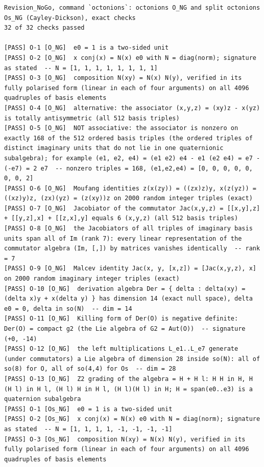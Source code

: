 \documentclass[
  10pt,
]{article}
\begin{document}
\begin{verbatim}
Revision_NoGo, command `octonions`: octonions O_NG and split octonions Os_NG (Cayley-Dickson), exact checks
32 of 32 checks passed

[PASS] O-1 [O_NG]  e0 = 1 is a two-sided unit
[PASS] O-2 [O_NG]  x conj(x) = N(x) e0 with N = diag(norm); signature as stated  -- N = [1, 1, 1, 1, 1, 1, 1, 1]
[PASS] O-3 [O_NG]  composition N(xy) = N(x) N(y), verified in its fully polarised form (linear in each of four arguments) on all 4096 quadruples of basis elements
[PASS] O-4 [O_NG]  alternative: the associator (x,y,z) = (xy)z - x(yz) is totally antisymmetric (all 512 basis triples)
[PASS] O-5 [O_NG]  NOT associative: the associator is nonzero on exactly 168 of the 512 ordered basis triples (the ordered triples of distinct imaginary units that do not lie in one quaternionic subalgebra); for example (e1, e2, e4) = (e1 e2) e4 - e1 (e2 e4) = e7 - (-e7) = 2 e7  -- nonzero triples = 168, (e1,e2,e4) = [0, 0, 0, 0, 0, 0, 0, 2]
[PASS] O-6 [O_NG]  Moufang identities z(x(zy)) = ((zx)z)y, x(z(yz)) = ((xz)y)z, (zx)(yz) = (z(xy))z on 2000 random integer triples (exact)
[PASS] O-7 [O_NG]  Jacobiator of the commutator Jac(x,y,z) = [[x,y],z] + [[y,z],x] + [[z,x],y] equals 6 (x,y,z) (all 512 basis triples)
[PASS] O-8 [O_NG]  the Jacobiators of all triples of imaginary basis units span all of Im (rank 7): every linear representation of the commutator algebra (Im, [,]) by matrices vanishes identically  -- rank = 7
[PASS] O-9 [O_NG]  Malcev identity Jac(x, y, [x,z]) = [Jac(x,y,z), x] on 2000 random imaginary integer triples (exact)
[PASS] O-10 [O_NG]  derivation algebra Der = { delta : delta(xy) = (delta x)y + x(delta y) } has dimension 14 (exact null space), delta e0 = 0, delta in so(N)  -- dim = 14
[PASS] O-11 [O_NG]  Killing form of Der(O) is negative definite: Der(O) = compact g2 (the Lie algebra of G2 = Aut(O))  -- signature (+0, -14)
[PASS] O-12 [O_NG]  the left multiplications L_e1..L_e7 generate (under commutators) a Lie algebra of dimension 28 inside so(N): all of so(8) for O, all of so(4,4) for Os  -- dim = 28
[PASS] O-13 [O_NG]  Z2 grading of the algebra = H + H l: H H in H, H (H l) in H l, (H l) H in H l, (H l)(H l) in H; H = span(e0..e3) is a quaternion subalgebra
[PASS] O-1 [Os_NG]  e0 = 1 is a two-sided unit
[PASS] O-2 [Os_NG]  x conj(x) = N(x) e0 with N = diag(norm); signature as stated  -- N = [1, 1, 1, 1, -1, -1, -1, -1]
[PASS] O-3 [Os_NG]  composition N(xy) = N(x) N(y), verified in its fully polarised form (linear in each of four arguments) on all 4096 quadruples of basis elements

\end{verbatim}
\end{document}
